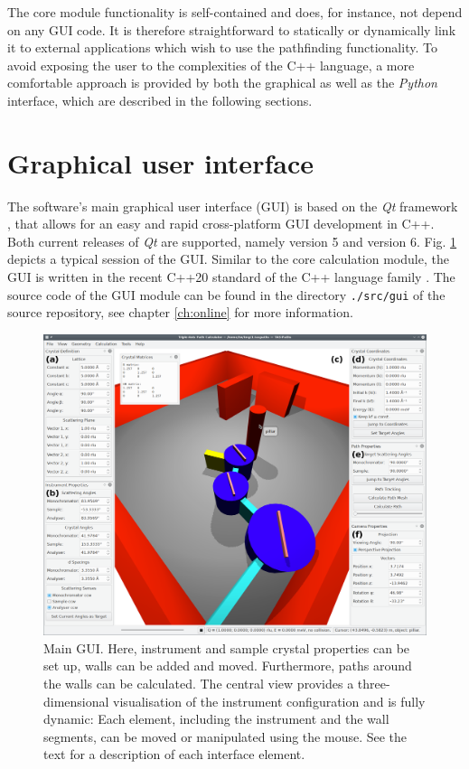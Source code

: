 The core module functionality is self-contained and does, for instance, not depend on any GUI code.
It is therefore straightforward to statically or dynamically link it to external applications which 
wish to use the pathfinding functionality. To avoid exposing the user to the complexities of
the C++ language, a more comfortable approach is provided by both the graphical as well 
as the \textit{Python} interface, which are described in the following sections.



\section{Graphical user interface}
\label{sec:gui}
The software's main graphical user interface (GUI) is based on the \textit{Qt} framework 
\cite{web_Qt}, that allows for an easy and rapid cross-platform GUI development in C++. 
Both current releases of \textit{Qt} are supported, namely version 5 and version 6.
Fig. \ref{fig:gui} depicts a typical session of the GUI.
Similar to the core calculation module, the GUI is written in the recent C++20
standard \cite{ISOCPP20} of the C++ language family \cite{Stroustrup2008, Stroustrup2018}.
The source code of the GUI module can be found in the directory \lstinline|./src/gui| of the
source repository, see chapter \ref{ch:online} for more information.

\begin{figure}[htb]
		\begin{center}
			\includegraphics[width = 1 \textwidth]{figures/gui}
		\end{center}
	\caption[Main program GUI.]{Main GUI. 
		Here, instrument and sample crystal properties can be set up,
		walls can be added and moved. 
		Furthermore, paths around the walls can be calculated.
		The central view provides a three-dimensional visualisation of the instrument
		configuration and is fully dynamic: Each element, including the instrument
		and the wall segments, can be moved or manipulated using the mouse.
		See the text for a description of each interface element.
		\label{fig:gui}}
\end{figure}

